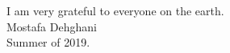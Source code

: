 \acknowledgments

I am very grateful to everyone on the earth.\\[2ex]				
\hfill Mostafa Dehghani\\
Summer of 2019.

